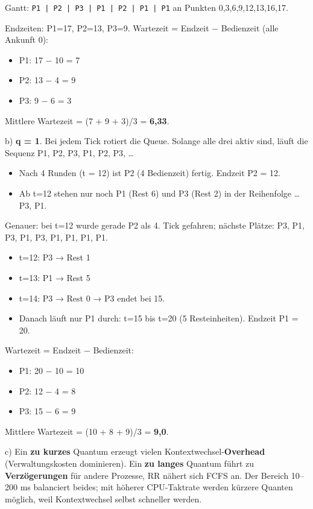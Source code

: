 \documentclass[11pt, a4paper]{article}
\begin{document}
Gantt: \texttt{P1 | P2 | P3 | P1 | P2 | P1 | P1} an Punkten 0,3,6,9,12,13,16,17.


Endzeiten: P1=17, P2=13, P3=9. Wartezeit = Endzeit − Bedienzeit (alle Ankunft 0):

\begin{itemize}
  \item P1: 17 − 10 = 7
  \item P2: 13 − 4 = 9
  \item P3: 9 − 6 = 3
\end{itemize}

Mittlere Wartezeit = (7 + 9 + 3)/3 = \textbf{6,33}.


b) \textbf{q = 1}. Bei jedem Tick rotiert die Queue. Solange alle drei aktiv sind, läuft die Sequenz P1, P2, P3, P1, P2, P3, …

\begin{itemize}
  \item Nach 4 Runden (t = 12) ist P2 (4 Bedienzeit) fertig. Endzeit P2 = 12.
  \item Ab t=12 stehen nur noch P1 (Rest 6) und P3 (Rest 2) in der Reihenfolge … P3, P1.
\end{itemize}
Genauer: bei t=12 wurde gerade P2 als 4. Tick gefahren; nächste Plätze: P3, P1, P3, P1, P3, P1, P1, P1, P1.

\begin{itemize}
  \item t=12: P3 → Rest 1
  \item t=13: P1 → Rest 5
  \item t=14: P3 → Rest 0 → P3 endet bei 15.
  \item Danach läuft nur P1 durch: t=15 bis t=20 (5 Resteinheiten). Endzeit P1 = 20.
\end{itemize}

Wartezeit = Endzeit − Bedienzeit:

\begin{itemize}
  \item P1: 20 − 10 = 10
  \item P2: 12 − 4 = 8
  \item P3: 15 − 6 = 9
\end{itemize}

Mittlere Wartezeit = (10 + 8 + 9)/3 = \textbf{9,0}.


c) Ein \textbf{zu kurzes} Quantum erzeugt vielen Kontextwechsel-\textbf{Overhead} (Verwaltungskosten dominieren). Ein \textbf{zu langes} Quantum führt zu \textbf{Verzögerungen} für andere Prozesse, RR nähert sich FCFS an. Der Bereich 10–200 ms balanciert beides; mit höherer CPU-Taktrate werden kürzere Quanten möglich, weil Kontextwechsel selbst schneller werden.
\end{document}
